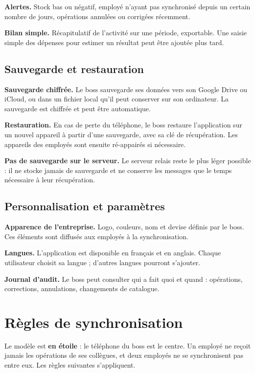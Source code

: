 \documentclass[11pt,a4paper]{article}
\newcommand{\fonc}[2]{\textbf{#1.} #2\par\vspace{0.2em}}
\begin{document}
	\fonc{Alertes}{Stock bas ou négatif, employé n'ayant pas synchronisé depuis un certain nombre de jours, opérations annulées ou corrigées récemment.}
	
	\fonc{Bilan simple}{Récapitulatif de l'activité sur une période, exportable. Une saisie simple des dépenses pour estimer un résultat peut être ajoutée plus tard.}
	
	\subsection{Sauvegarde et restauration}
	
	\fonc{Sauvegarde chiffrée}{Le boss sauvegarde ses données vers son Google Drive ou iCloud, ou dans un fichier local qu'il peut conserver sur son ordinateur. La sauvegarde est chiffrée et peut être automatique.}
	
	\fonc{Restauration}{En cas de perte du téléphone, le boss restaure l'application sur un nouvel appareil à partir d'une sauvegarde, avec sa clé de récupération. Les appareils des employés sont ensuite ré-appairés si nécessaire.}
	
	\fonc{Pas de sauvegarde sur le serveur}{Le serveur relais reste le plus léger possible : il ne stocke jamais de sauvegarde et ne conserve les messages que le temps nécessaire à leur récupération.}
	
	\subsection{Personnalisation et paramètres}
	
	\fonc{Apparence de l'entreprise}{Logo, couleurs, nom et devise définis par le boss. Ces éléments sont diffusés aux employés à la synchronisation.}
	
	\fonc{Langues}{L'application est disponible en français et en anglais. Chaque utilisateur choisit sa langue ; d'autres langues pourront s'ajouter.}
	
	\fonc{Journal d'audit}{Le boss peut consulter qui a fait quoi et quand : opérations, corrections, annulations, changements de catalogue.}
	
	\section{Règles de synchronisation}
	Le modèle est \textbf{en étoile} : le téléphone du boss est le centre. Un employé ne reçoit jamais les opérations de ses collègues, et deux employés ne se synchronisent pas entre eux. Les règles suivantes s'appliquent.
	
\end{document}
